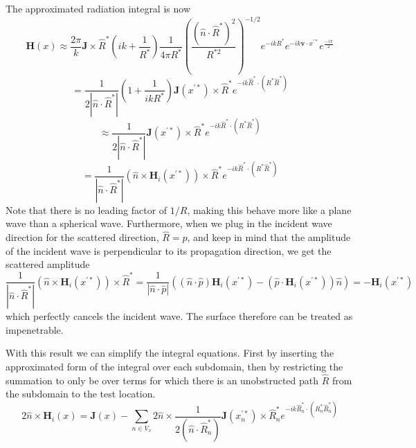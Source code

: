 \documentclass{article}
\newcommand{\abs}[1]{\left\lvert #1 \right\rvert}
\theoremstyle{plain}
\begin{document}
The approximated radiation integral is now 
\begin{equation}
	\mathbf{H}(x) \approx
	\frac{2\pi}{k}
	\mathbf{J} \times \hat{R}^*
	\left( ik + \frac{1}{R^*} \right)
	\frac{1}{4\pi R^*}
	\left( \frac{\left(\hat{n}\cdot\hat{R}^*\right)^2}{R^{*2}} \right)^{-1/2}
	e^{-ikR^*}
	e^{-ik\mathbf{v}\cdot x^{'*}}
	e^{\frac{-i\pi}{2}}
\end{equation}
\begin{equation}
	=
	\frac{1}{2\abs{\hat{n}\cdot\hat{R}^*}}
	\left( 1 + \frac{1}{ikR^*} \right)
	\mathbf{J}(x^{'*}) \times \hat{R}^*
	e^{-ik\hat{R}^*\cdot (R^*\hat{R}^*)}
\end{equation}
\begin{equation}
	\approx
	\frac{1}{2\abs{\hat{n}\cdot\hat{R}^*}}
	\mathbf{J}(x^{'*}) \times \hat{R}^*
	e^{-ik\hat{R}^*\cdot (R^*\hat{R}^*)}
\end{equation}
\begin{equation}
	=
	\frac{1}{\abs{\hat{n}\cdot\hat{R}^*}}
	\left( \hat{n} \times \mathbf{H}_i(x^{'*}) \right) \times \hat{R}^*
	e^{-ik\hat{R}^*\cdot (R^*\hat{R}^*)}
\end{equation}
Note that there is no leading factor of $1/R$,
making this behave more like a plane wave than a spherical wave.
Furthermore, when we plug in the incident wave direction for the scattered direction, 
$\hat{R}=\hat{p}$, 
and keep in mind that the amplitude of the incident wave is perpendicular to its propagation direction,
we get the scattered amplitude
\begin{equation}
	\frac{1}{\abs{\hat{n}\cdot\hat{R}^*}}
	\left( \hat{n} \times \mathbf{H}_i(x^{'*}) \right) \times \hat{R}^*
	=
	\frac{1}{\abs{\hat{n}\cdot\hat{p}}}
	\left( \left(\hat{n}\cdot\hat{p}\right)\mathbf{H}_i(x^{'*}) - \left( \hat{p}\cdot\mathbf{H}_i(x^{'*}) \right)\hat{n} \right)
	= -\mathbf{H}_i(x^{'*})
\end{equation}
which perfectly cancels the incident wave.
The surface therefore can be treated as impenetrable.


With this result we can simplify the integral equations.
First by inserting the approximated form of the integral over each subdomain,
then by restricting the summation to only be over terms for which there is an
unobstructed path $\hat{R}$ from the subdomain to the test location.
\begin{equation}
	2\hat{n}\times\mathbf{H}_i(x)
	= \mathbf{J}(x)
	- \sum_{n\in V_x} 2\hat{n}\times
	\frac{1}{2\left(\hat{n}\cdot\hat{R}^*_n\right)}
	\mathbf{J}(x^{'*}_n) \times \hat{R}^*_n
	e^{-ik\hat{R}^*_n\cdot (R^*_n\hat{R}^*_n)}
\end{equation}
\end{document}
